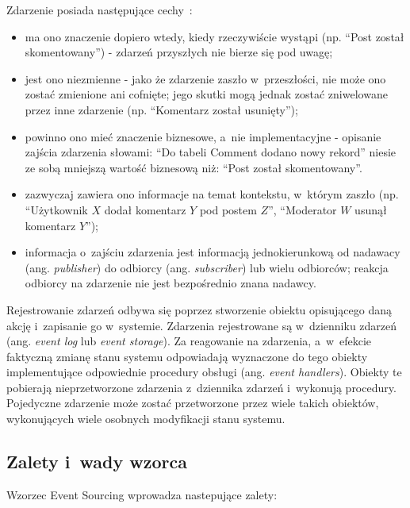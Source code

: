 Zdarzenie posiada następujące cechy~\cite{eventSourcing_intro}:

\begin{itemize}
 \item ma ono znaczenie dopiero wtedy, kiedy rzeczywiście wystąpi (np. ``Post został skomentowany'') - zdarzeń przyszłych nie bierze się pod uwagę;
 \item jest ono niezmienne - jako że zdarzenie zaszło w~przeszłości, nie może ono zostać zmienione ani cofnięte; jego skutki mogą jednak zostać zniwelowane przez inne zdarzenie (np. ``Komentarz został usunięty'');
 \item powinno ono mieć znaczenie biznesowe, a~nie implementacyjne - opisanie zajścia zdarzenia słowami: ``Do tabeli Comment dodano nowy rekord'' niesie ze sobą mniejszą wartość biznesową niż: ``Post został skomentowany''.
 \item zazwyczaj zawiera ono informacje na temat kontekstu, w~którym zaszło (np. ``Użytkownik $X$ dodał komentarz $Y$ pod postem $Z$'', ``Moderator $W$ usunął komentarz $Y$'');
 \item informacja o~zajściu zdarzenia jest informacją jednokierunkową od nadawacy (ang. \emph{publisher}) do odbiorcy (ang. \emph{subscriber}) lub wielu odbiorców; reakcja odbiorcy na zdarzenie nie jest bezpośrednio znana nadawcy.\\
\end{itemize}

Rejestrowanie zdarzeń odbywa się poprzez stworzenie obiektu opisującego daną akcję i~zapisanie go w~systemie.
Zdarzenia rejestrowane są w~dzienniku zdarzeń (ang. \emph{event log} lub \emph{event storage}).
Za reagowanie na zdarzenia, a~w~efekcie faktyczną zmianę stanu systemu odpowiadają wyznaczone do tego obiekty implementujące odpowiednie procedury obsługi (ang. \emph{event handlers}).
Obiekty te pobierają nieprzetworzone zdarzenia z~dziennika zdarzeń i~wykonują procedury.
Pojedyczne zdarzenie może zostać przetworzone przez wiele takich obiektów, wykonujących wiele osobnych modyfikacji stanu systemu.


\subsection{Zalety i~wady wzorca}

Wzorzec Event Sourcing wprowadza nastepujące zalety:

